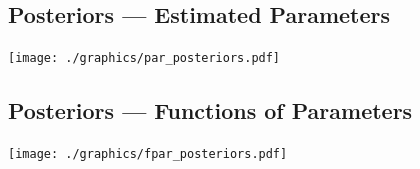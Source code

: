\documentclass[letterpaper,KOMA,landscape,titlepage]{powersem}
\begin{document}
\begin{slide}\section{Posteriors --- Estimated Parameters}
\begin{center}
\texttt{[image: ./graphics/par\_posteriors.pdf]}
\end{center}
\end{slide}

\begin{slide}\section{Posteriors --- Functions of Parameters}
\begin{center}
\texttt{[image: ./graphics/fpar\_posteriors.pdf]}
\end{center}
\end{slide}
\end{document}
